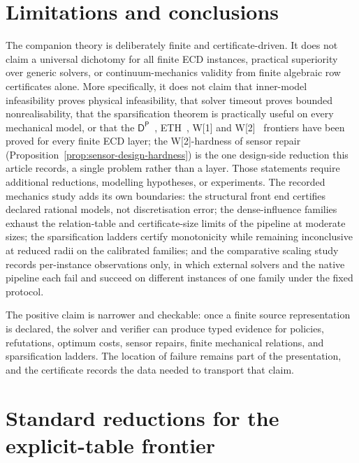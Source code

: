 \documentclass[11pt]{article}
\theoremstyle{plain}
\theoremstyle{definition}
\theoremstyle{remark}
\begin{document}
\section{Limitations and conclusions}
\label{sec:limitations}

The companion theory is deliberately finite and certificate-driven.  It does not
claim a universal dichotomy for all finite ECD instances, practical superiority
over generic solvers, or continuum-mechanics validity from finite algebraic row
certificates alone.  More specifically, it does not claim that inner-model
infeasibility proves physical infeasibility, that solver timeout proves bounded
nonrealisability, that the sparsification theorem is practically useful on every
mechanical model, or that the \(\mathsf
D^{\mathsf P}\)~\cite{papadimitriou94}, ETH~\cite{impagliazzo-paturi01},
W[1] and W[2]~\cite{downey-fellows99}
frontiers have been proved for every finite ECD layer; the W[2]-hardness of
sensor repair (Proposition~\ref{prop:sensor-design-hardness}) is the one
design-side reduction this article records, a single problem rather than a
layer.  Those statements require
additional reductions, modelling hypotheses, or experiments.  The recorded
mechanics study adds its own boundaries: the structural front end certifies
declared rational models, not discretisation error; the dense-influence families
exhaust the relation-table and certificate-size limits of the pipeline at
moderate sizes; the sparsification ladders certify monotonicity while remaining
inconclusive at reduced radii on the calibrated families; and the comparative
scaling study records per-instance observations only, in which external solvers
and the native pipeline each fail and succeed on different instances of one
family under the fixed protocol.

The positive claim is narrower and checkable: once a finite source
representation is declared, the solver and verifier can produce typed evidence
for policies, refutations, optimum costs, sensor repairs, finite mechanical
relations, and sparsification ladders.  The location of failure remains part of
the presentation, and the certificate records the data needed to transport that
claim.



\section{Standard reductions for the explicit-table frontier}
\label{app:reductions}
\end{document}
